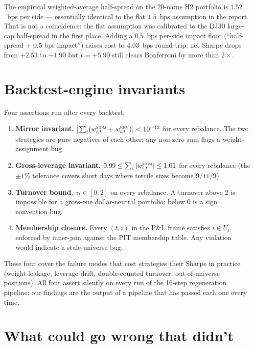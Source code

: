 \documentclass[10pt,conference,compsoc]{IEEEtran}
\newcommand{\MOM}{\textsc{mom}}  \newcommand{\REV}{\textsc{rev}}
\begin{document}
The empirical weighted-average half-spread on the 20-name H2
portfolio is $1.52$~bps per side --- essentially identical to the
flat $1.5$~bps assumption in the report. That is not a coincidence:
the flat assumption was calibrated to the DJ30 large-cap half-spread
in the first place. Adding a $0.5$~bps per-side impact floor
(``half-spread + 0.5 bps impact'') raises cost to $4.03$~bps
round-trip; net Sharpe drops from $+2.53$ to $+1.90$ but $t{=}+5.90$
still clears Bonferroni by more than $2\times$.

\section{Backtest-engine invariants}
\label{app:invariants}

Four assertions run after every backtest:

\begin{enumerate}[leftmargin=*]
  \item \textbf{Mirror invariant.}
    $\bigl|\sum_i (w^{\MOM}_{i,t} + w^{\REV}_{i,t})\bigr| < 10^{-12}$
    for every rebalance. The two strategies are pure negatives of
    each other; any non-zero sum flags a weight-assignment bug.
  \item \textbf{Gross-leverage invariant.}
    $0.99 \leq \sum_i |w^{\MOM}_{i,t}| \leq 1.01$ for every
    rebalance (the $\pm 1\%$ tolerance covers short days where
    tercile sizes become $9/11/9$).
  \item \textbf{Turnover bound.}
    $\tau_t \in [0, 2]$ on every rebalance. A turnover above 2 is
    impossible for a gross-one dollar-neutral portfolio; below 0
    is a sign convention bug.
  \item \textbf{Membership closure.} Every $(t, i)$ in the P\&L
    frame satisfies $i \in U_t$, enforced by inner-join against
    the PIT membership table. Any violation would indicate a
    stale-universe bug.
\end{enumerate}

These four cover the failure modes that cost strategies their
Sharpe in practice (weight-leakage, leverage drift, double-counted
turnover, out-of-universe positions). All four assert silently on
every run of the 16-step regeneration pipeline; our
findings are the output of a pipeline that has passed each one
every time.

\section{What could go wrong that didn't}
\label{app:gremlins}
\end{document}
